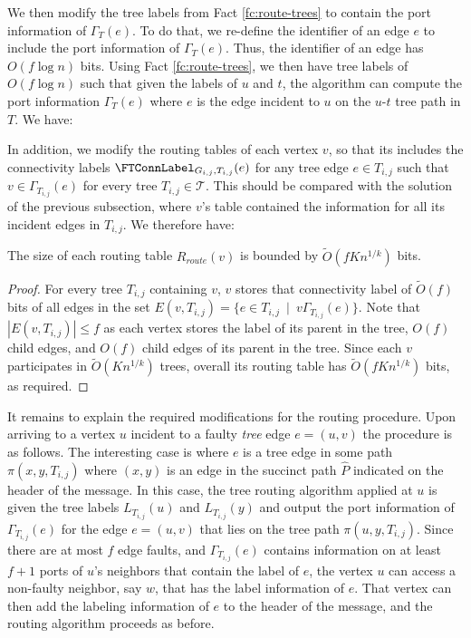 We then modify the tree labels from Fact \ref{fc:route-trees} to contain the port information of $\Gamma_T(e)$. 
To do that, we re-define the identifier of an edge $e$ to include the port information of $\Gamma_T(e)$. Thus, the identifier of an edge has $O(f\log n)$ bits. Using Fact \ref{fc:route-trees}, we then have tree labels of $O(f\log n)$ such that given the labels of $u$ and $t$, the algorithm can compute the port information $\Gamma_T(e)$ where $e$ is the edge incident to $u$ on the $u$-$t$ tree path in $T$. We have:
\begin{claim}\label{cl:tree-label-port}


\end{claim}

In addition, we modify the routing tables of each vertex $v$, so that its includes the connectivity labels $\FTConnLabel_{G_{i,j},T_{i,j}}(e)$ for any tree edge $e \in T_{i,j}$ such that $v \in \Gamma_{T_{i,j}}(e)$ for every tree $T_{i,j} \in \mathcal{T}$. This should be compared with the solution of the previous subsection, where $v$'s table contained the information for all its incident edges in $T_{i,j}$. We therefore have:
\begin{claim}\label{cl:route-balance-table}
The size of each routing table $R_{route}(v)$ is bounded by $\widetilde{O}(f K n^{1/k})$ bits.
\end{claim}
\begin{proof}
For every tree $T_{i,j}$ containing $v$, $v$ stores that connectivity label of $\widetilde{O}(f)$ bits of all edges in the set $E(v,T_{i,j})=\{e \in T_{i,j} ~\mid~ v \Gamma_{T_{i,j}}(e)\}$. Note that $|E(v,T_{i,j})|\leq f$ as each vertex stores the label of its parent in the tree, $O(f)$ child edges, and $O(f)$ child edges of its parent in the tree. Since each $v$ participates in $\widetilde{O}(K n^{1/k})$ trees, overall its routing table has $\widetilde{O}(f K n^{1/k})$ bits, as required. 
\end{proof}

It remains to explain the required modifications for the routing procedure. Upon arriving to a vertex $u$ incident to a faulty \emph{tree} edge $e=(u,v)$ the procedure is as follows. The interesting case is where $e$ is a tree edge in some path $\pi(x,y,T_{i,j})$ where $(x,y)$ is an edge in the succinct path $\widehat{P}$ indicated on the header of the message. 
In this case, the tree routing algorithm applied at $u$ is given the tree labels $L_{T_{i,j}}(u)$ and $L_{T_{i,j}}(y)$ and output the port information of $\Gamma_{T_{i,j}}(e)$ for the edge $e=(u,v)$ that lies on the tree path $\pi(u,y, T_{i,j})$. Since there are at most $f$ edge faults, and $\Gamma_{T_{i,j}}(e)$ contains information on at least $f+1$ ports of $u$'s neighbors that contain the label of $e$, the vertex $u$ can access a non-faulty neighbor, say $w$, that has the label information of $e$. That vertex can then add the labeling information of $e$ to the header of the message, and the routing algorithm proceeds as before. 



